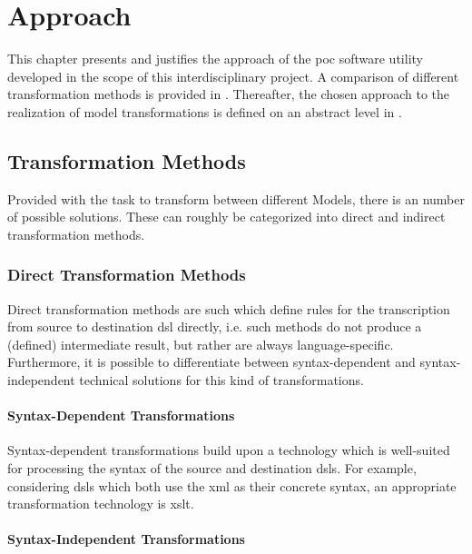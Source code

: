 \chapter{Approach}
\label{chap:approach}

This chapter presents and justifies the approach of the \gls{poc} software utility developed in the scope of this interdisciplinary project. A comparison of different transformation methods is provided in . Thereafter, the chosen approach to the realization of model transformations is defined on an abstract level in .

\section{Transformation Methods}
\label{sec:approach:transform}

Provided with the task to transform between different Models, there is an number of possible solutions. These can roughly be categorized into direct and indirect transformation methods.

\subsection{Direct Transformation Methods}

Direct transformation methods are such which define rules for the transcription from source to destination \gls{dsl} directly, i.e. such methods do not produce a (defined) intermediate result, but rather are always language-specific. Furthermore, it is possible to differentiate between syntax-dependent and syntax-independent technical solutions for this kind of transformations.

\subsubsection{Syntax-Dependent Transformations}

Syntax-dependent transformations build upon a technology which is well-suited for processing the syntax of the source and destination \glspl{dsl}. For example, considering \glspl{dsl} which both use the \gls{xml}\cite{ref:xml} as their concrete syntax, an appropriate transformation technology is \gls{xslt}\cite{ref:xslt}.

\subsubsection{Syntax-Independent Transformations}

